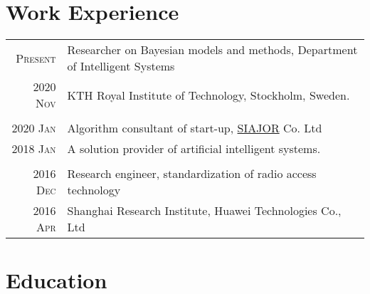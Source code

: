 \documentclass[a4paper,10pt]{article}
\begin{document}
\section{Work Experience}
\begin{tabular}{r|p{13cm}}
  \textsc{Present}  & Researcher on Bayesian models and methods, Department of Intelligent Systems \\
  \textsc{2020 Nov}  & KTH Royal Institute of Technology, Stockholm, Sweden.\\
  \multicolumn{2}{c}{} \\

  \textsc{2020 Jan}  & Algorithm consultant of start-up, \href{http://www.siajor.com/}{SIAJOR} Co. Ltd \\
  \textsc{2018 Jan}  & A solution provider of artificial intelligent systems. \\
  \multicolumn{2}{c}{} \\

  \textsc{2016 Dec}  & Research engineer, standardization of radio access technology  \\
  \textsc{2016 Apr}  & Shanghai Research Institute, Huawei Technologies Co., Ltd \\
\end{tabular}



\section{Education}
\end{document}
